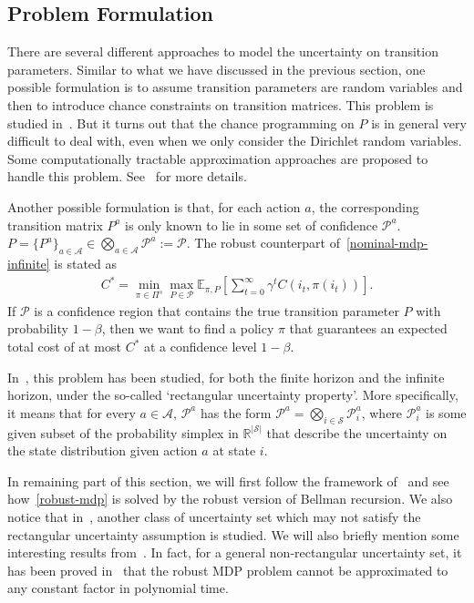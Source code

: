 \documentclass[11pt,reqno]{amsart}
\theoremstyle{definition}
\numberwithin{equation}{section}
\theoremstyle{remark}
\begin{document}

\subsection{Problem Formulation}There are several different approaches to model the uncertainty on transition parameters. Similar to what we have discussed in the previous section, one possible formulation is to assume transition parameters are random variables and then to introduce chance constraints on transition matrices. This problem is studied in~\cite{delage2010percentile}. But it turns out that the chance programming on $P$ is in general very difficult to deal with, even when we only consider the Dirichlet random variables. Some computationally tractable approximation approaches are proposed to handle this problem. See~\cite{delage2010percentile} for more details.

\medskip

Another possible formulation is that, for each action $a$, the corresponding transition matrix $P^a$ is only known to lie in some set of confidence $\mathcal{P}^a$. $P=\{{P^a}\}_{a\in\mathcal{A}}\in\bigotimes_{a\in\mathcal{A}}\mathcal{P}^a:=\mathcal{P}$. The robust counterpart of~\ref{nominal-mdp-infinite} is stated as
\begin{align}\label{robust-mdp}
    C^*=\min_{\pi\in\Pi^s} \max_{P\in\mathcal{P}} \mathbb{E}_{\pi, P} \left[\sum_{t=0}^{\infty}\gamma^t C(i_t, \pi(i_t))\right].
\end{align}
If $\mathcal{P}$ is a confidence region that contains the true transition parameter $P$ with probability $1-\beta$, then we want to find a policy $\pi$ that guarantees an expected total cost of at most $C^*$ at a confidence level $1-\beta$.

\medskip

In~\cite{nilim2005robust}, this problem has been studied, for both the finite horizon and the infinite horizon, under the so-called `rectangular uncertainty property'. More specifically, it means that for every $a\in\mathcal{A}$, $\mathcal{P}^a$ has the form $\mathcal{P}^a=\bigotimes_{i\in\mathcal{S}}\mathcal{P}^a_i$, where $\mathcal{P}^a_i$ is some given subset of the probability simplex in $\mathbb{R}^{|\mathcal{S}|}$ that describe the uncertainty on the state distribution given action $a$ at state $i$.

\medskip

In remaining part of this section, we will first follow the framework of~\cite{nilim2005robust} and see how~\ref{robust-mdp} is solved by the robust version of Bellman recursion. We also notice that in~\cite{wiesemann2013robust}, another class of uncertainty set which may not satisfy the rectangular uncertainty assumption is studied. We will also briefly mention some interesting results from~\cite{wiesemann2013robust}. In fact, for a general non-rectangular uncertainty set, it has been proved in~\cite{wiesemann2013robust} that the robust MDP problem cannot be approximated to any constant factor in polynomial time.
\end{document}

